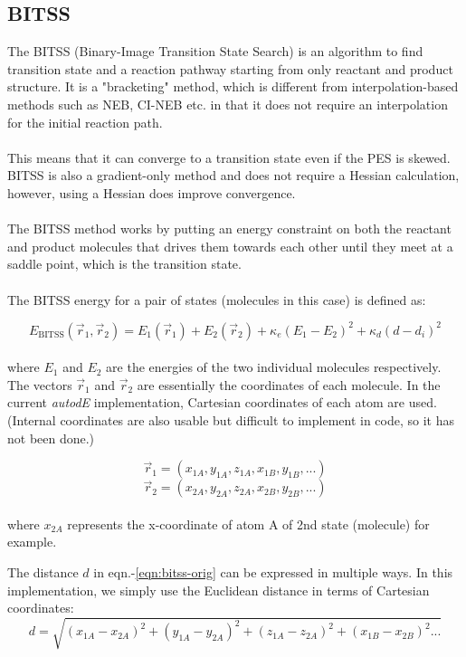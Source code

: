\documentclass[10pt]{article}
\begin{document}
	
\subsection{BITSS}

The BITSS (Binary-Image Transition State Search) is an algorithm to find transition state and a reaction pathway starting from only reactant and product structure. It is a "bracketing" method, which is different from interpolation-based methods such as NEB, CI-NEB etc. in that it does not require an interpolation for the initial reaction path.
\\\\
This means that it can converge to a transition state even if the PES is skewed. BITSS is also a gradient-only method and does not require a Hessian calculation, however, using a Hessian does improve convergence.
\\\\
The BITSS method works by putting an energy constraint on both the reactant and product molecules that drives them towards each other until they meet at a saddle point, which is the transition state.
\\\\
The BITSS energy for a pair of states (molecules in this case) is defined as:

\begin{equation}
	E_\mathrm{BITSS}(\vec r_1,\vec r_2) = E_1 (\vec r_1) + E_2 (\vec r_2) + \kappa_e(E_1 - E_2)^2 + \kappa_d (d - d_i)^2
	\label{eqn:bitss-orig}
\end{equation}
\\
where $E_1$ and $E_2$ are the energies of the two individual molecules respectively. The vectors $\vec r_1$ and $\vec r_2$ are essentially the coordinates of each molecule. In the current \emph{autodE} implementation, Cartesian coordinates of each atom are used. (Internal coordinates are also usable but difficult to implement in code, so it has not been done.)

\begin{equation}
	\vec r_1 = (x_{1A},y_{1A},z_{1A},x_{1B},y_{1B},...)
\end{equation}
\begin{equation}
	\vec r_2 = (x_{2A},y_{2A},z_{2A},x_{2B},y_{2B},...)
\end{equation}
\\
where $x_{2A}$ represents the x-coordinate of atom A of 2nd state (molecule) for example.

The distance $d$ in eqn.-\eqref{eqn:bitss-orig} can be expressed in multiple ways. In this implementation, we simply use the Euclidean distance in terms of Cartesian coordinates:
\begin{equation}
	d = \sqrt{(x_{1A}-x_{2A})^2 + (y_{1A}-y_{2A})^2 + (z_{1A} - z_{2A})^2 + (x_{1B}-x_{2B})^2...}
\end{equation}
\end{document}
